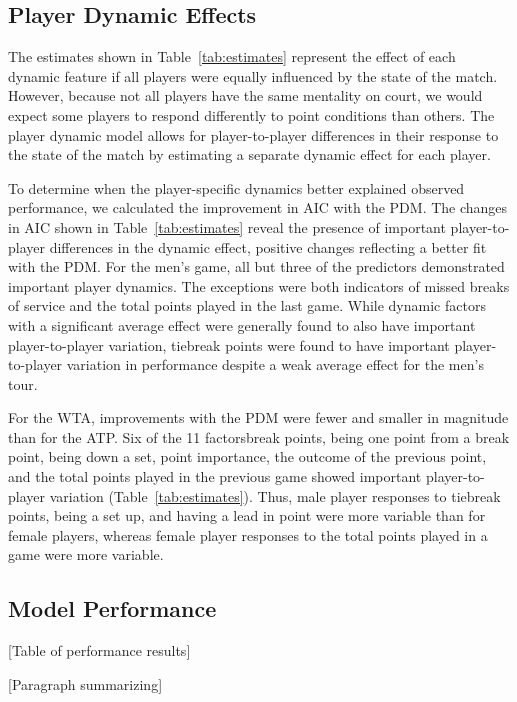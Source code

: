 \documentclass{Latex/svjour3}
\begin{document}
\subsection{Player Dynamic Effects}


The estimates shown in Table~\ref{tab:estimates} represent the effect of each dynamic feature if all players were equally
influenced by the state of the match. However, because not all players
have the same mentality on court, we would expect some players to respond differently to point conditions than others. The player dynamic
model allows for player-to-player differences in their response to the
state of the match by
estimating a separate dynamic effect for each player. 

To determine
when the player-specific dynamics better explained observed
performance, we calculated the improvement in AIC with the PDM. The changes in
AIC shown in Table~\ref{tab:estimates} reveal the presence of
important player-to-player differences in the dynamic effect, positive
changes reflecting a better fit with the PDM. For the men's game, all but three of the predictors demonstrated
important player dynamics. The exceptions were both indicators of missed
breaks of service and the total points played in the last game. While
dynamic factors with a significant average effect were generally found
to also have important player-to-player variation, tiebreak points
were found to have important player-to-player variation in performance
despite a weak average effect for the men's tour. 

For the WTA, improvements with the PDM were fewer and smaller in
magnitude than for the ATP. Six of the 11 factors\textemdash break
points, being one point from a break point, being down a set, point
importance, the outcome of the previous point, and the total points
played in the previous game \textemdash showed important
player-to-player variation (Table~\ref{tab:estimates}). Thus, male
player responses to tiebreak points, being a set up, and having a lead
in point were more variable than for female players, whereas female
player responses to the total points played in a game were more variable. 

\subsection{Model Performance}

[Table of performance results]

[Paragraph summarizing]
\end{document}
